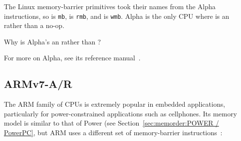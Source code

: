 The Linux memory-barrier primitives took their names from the Alpha
instructions, so  is {\tt mb},  is {\tt rmb},
and  is {\tt wmb}.
Alpha is the only CPU where  is
an  rather than a no-op.

\QuickQuiz{}
	Why is Alpha's  an
	 rather than ?
 \QuickQuizEnd

For more on Alpha, see its reference manual~\cite{ALPHA2002}.

\subsection{ARMv7-A/R}
\label{sec:memorder:ARMv7-A/R}

The ARM family of CPUs is extremely popular in embedded applications,
particularly for power-constrained applications such as cellphones.
Its memory model is similar to that of Power
(see Section~\ref{sec:memorder:POWER / PowerPC}, but ARM uses a
different set of memory-barrier instructions~\cite{ARMv7A:2010}:

